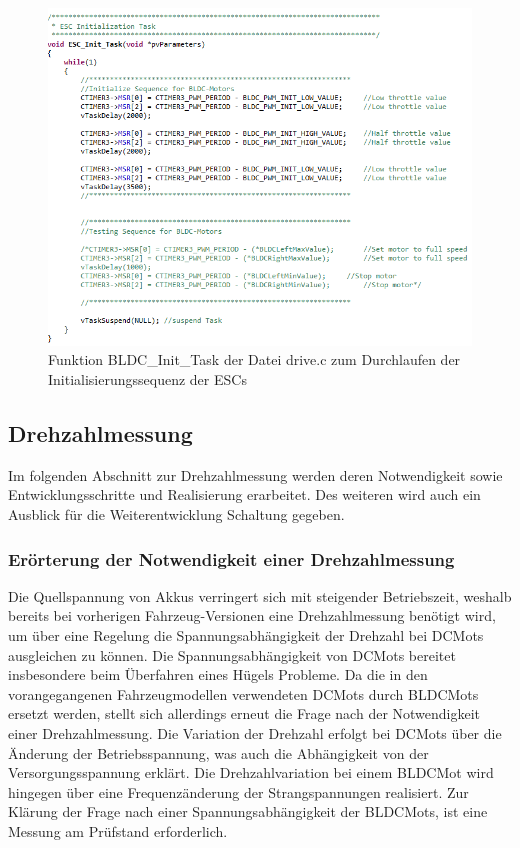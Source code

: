 \begin{figure}[H] %
\includegraphics[width=.9\textwidth]{sec4/images/DriveC2} 
\centering
\captionsetup{width=.95\textwidth}
\caption[Funktion BLDC\_Init\_Task der Datei \glqq{}drive.c\grqq{}]{Funktion BLDC\_Init\_Task der Datei \glqq{}drive.c\grqq{} zum Durchlaufen der Initialisierungssequenz der \ac{ESC}s}\centering
\label{fig:DriveC2}
\end{figure}





\newpage
\subsection{Drehzahlmessung}\label{Sec4Sub5}

Im folgenden Abschnitt zur Drehzahlmessung werden deren Notwendigkeit sowie Entwicklungsschritte und Realisierung erarbeitet. Des weiteren wird auch ein Ausblick für die Weiterentwicklung Schaltung gegeben.

\subsubsection{Erörterung der Notwendigkeit einer Drehzahlmessung}\label{Sec:NotwendigkeitDrehzahlmessung}

Die Quellspannung von Akkus verringert sich mit steigender Betriebszeit, weshalb bereits bei vorherigen Fahrzeug-Versionen eine Drehzahlmessung benötigt wird, um über eine Regelung die Spannungsabhängigkeit der Drehzahl bei \acp{DCMot} ausgleichen zu können. Die Spannungsabhängigkeit von \acp{DCMot} bereitet insbesondere beim Überfahren eines Hügels Probleme. Da die in den vorangegangenen Fahrzeugmodellen verwendeten \acp{DCMot} durch \acp{BLDCMot} ersetzt werden, stellt sich allerdings erneut die Frage nach der Notwendigkeit einer Drehzahlmessung. Die Variation der Drehzahl erfolgt bei \acp{DCMot} über die Änderung der Betriebsspannung, was auch die Abhängigkeit von der Versorgungsspannung erklärt. Die Drehzahlvariation bei einem \ac{BLDCMot} wird hingegen über eine Frequenzänderung der Strangspannungen realisiert. Zur Klärung der Frage nach einer Spannungsabhängigkeit der \acp{BLDCMot}, ist eine Messung am Prüfstand erforderlich.

